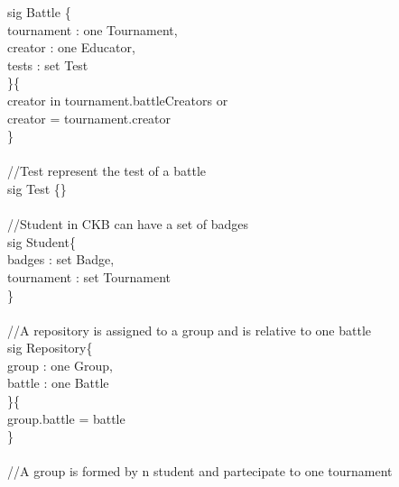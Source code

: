 \documentclass{article}
\begin{document}
{\color{blue}
sig
\color{black}
Battle \{\\
\-\hspace{1cm}    tournament : \color{blue} one \color{black} Tournament,\\
\-\hspace{1cm}    creator : \color{blue} one \color{black} Educator,\\
\-\hspace{1cm}	tests : \color{blue} set \color{black} Test\\
\}\{\\
\-\hspace{1cm}	creator \color{blue} in \color{black} tournament.battleCreators \color{blue} or \color{black}\\
\-\hspace{1cm}	creator \color{blue} = \color{black} tournament.creator\\
\}\\
\color{gray}
\\
//Test represent the test of a battle\\
\color{blue}
sig
\color{black}
Test \{\}\\
\color{gray}
\\
//Student in CKB can have a set of badges\\
\color{blue}
sig
\color{black}
Student\{\\
\-\hspace{1cm}    badges : \color{blue} set \color{black} Badge,\\
\-\hspace{1cm}    tournament : \color{blue} set \color{black} Tournament\\
\}\\
\color{gray}
\\
//A repository is assigned to a group and is relative to one battle\\
\color{blue}
sig
\color{black}
Repository\{\\
\-\hspace{1cm}    group : \color{blue} one \color{black} Group,\\
\-\hspace{1cm}    battle : \color{blue} one \color{black} Battle\\
\}\{\\
\-\hspace{1cm}    group.battle \color{blue} = \color{black} battle\\
\}\\
\\
\color{gray}
//A group is formed by n student and partecipate to one tournament\\
}
\end{document}
